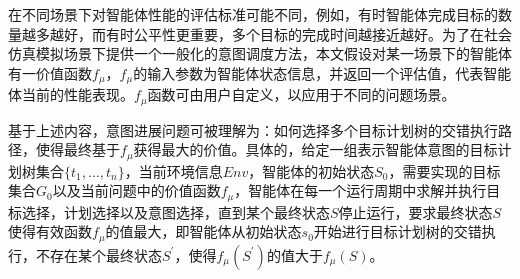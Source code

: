 %
在不同场景下对智能体性能的评估标准可能不同，例如，有时智能体完成目标的数量越多越好，而有时公平性更重要，多个目标的完成时间越接近越好。为了在社会仿真模拟场景下提供一个一般化的意图调度方法，本文假设对某一场景下的智能体有一价值函数$f_{\mu}$，$f_{\mu}$的输入参数为智能体状态信息，并返回一个评估值，代表智能体当前的性能表现。$f_{\mu}$函数可由用户自定义，以应用于不同的问题场景。

基于上述内容，意图进展问题可被理解为：如何选择多个目标计划树的交错执行路径，使得最终基于$f_{\mu}$获得最大的价值。具体的，给定一组表示智能体意图的目标计划树集合$\{t_1, \dots, t_n\}$，当前环境信息$Env$，智能体的初始状态$S_0$，需要实现的目标集合$G_0$以及当前问题中的价值函数$f_{\mu}$，智能体在每一个运行周期中求解并执行目标选择，计划选择以及意图选择，直到某个最终状态$S$停止运行，要求最终状态$S$使得有效函数$f_{\mu}$的值最大，即智能体从初始状态$s_0$开始进行目标计划树的交错执行，不存在某个最终状态$S^{\prime}$，使得$f_{\mu}(S^{\prime})$的值大于$f_{\mu}(S)$。
